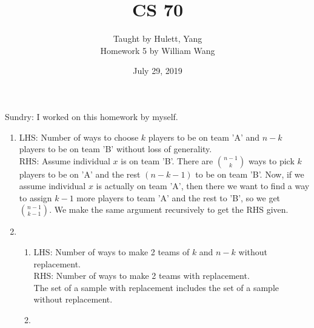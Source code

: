 \documentclass[a4paper]{article}
\title{\textbf{CS 70}}
\author{\large Taught by Hulett, Yang\\
Homework 5 by William Wang}
\date{July 29, 2019}
\newcommand{\<}{\langle}
\renewcommand{\>}{\rangle}
\renewcommand{\^}{\wedge}
\begin{document}
\maketitle
\newpage
Sundry: I worked on this homework by myself.\\
\begin{enumerate}
    \item LHS: Number of ways to choose $k$ players to be on team 'A' and $n-k$ players to be on team 'B' without loss of generality.\\
    RHS: Assume individual $x$ is on team 'B'. There are $n-1 \choose k$ ways to pick $k$ players to be on 'A' and the rest $(n-k-1)$ to be on team 'B'. Now, if we assume individual $x$ is actually on team 'A', then there we want to find a way to assign $k-1$ more players to team 'A' and the rest to 'B', so we get $n-1 \choose k-1$. We make the same argument recursively to get the RHS given.
    \item
        \begin{enumerate}
            \item LHS: Number of ways to make 2 teams of $k$ and $n-k$ without replacement.\\
            RHS: Number of ways to make 2 teams with replacement.\\
            The set of a sample with replacement includes the set of a sample without replacement.
            \item 
        \end{enumerate}
\end{enumerate}
\end{document}
